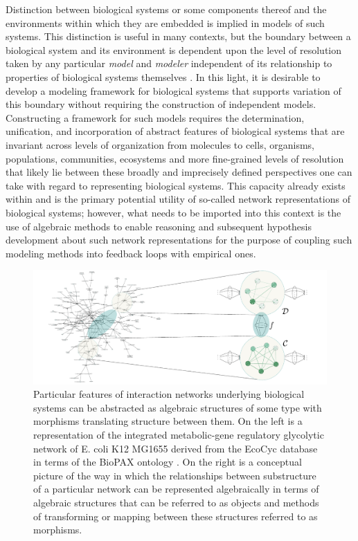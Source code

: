 \documentclass[aps,twocolumn]{revtex4-1}
\begin{document}
Distinction between biological systems or some components thereof and the environments within which they are embedded is implied in models of such systems. This distinction is useful in many contexts, but the boundary between a biological system and its environment is dependent upon the level of resolution taken by any particular \emph{model} and \emph{modeler} independent of its relationship to properties of biological systems themselves \cite{Fontana1996}. In this light, it is desirable to develop a modeling framework for biological systems that supports variation of this boundary without requiring the construction of independent models. Constructing a framework for such models requires the determination, unification, and incorporation of abstract features of biological systems that are invariant across levels of organization from molecules to cells, organisms, populations, communities, ecosystems and more fine-grained levels of resolution that likely lie between these broadly and imprecisely defined perspectives one can take with regard to representing biological systems. This capacity already exists within and is the primary potential utility of so-called network representations of biological systems; however, what needs to be imported into this context is the use of algebraic methods to enable reasoning and subsequent hypothesis development about such network representations for the purpose of coupling such modeling methods into feedback loops with empirical ones.

\begin{figure}
\noindent\includegraphics[width=1.9\columnwidth]{fig/biograph.pdf}
\caption{Particular features of interaction networks underlying biological systems can be abstracted as algebraic structures of some type with morphisms translating structure between them. On the left is a representation of the integrated metabolic-gene regulatory glycolytic network of E. coli K12 MG1655 derived from the EcoCyc database \cite{Keseler2011} in terms of the BioPAX ontology \cite{Demir2010}. On the right is a conceptual picture of the way in which the relationships between substructure of a particular network can be represented algebraically in terms of algebraic structures that can be referred to as objects and methods of transforming or mapping between these structures referred to as morphisms.}
\label{fig:biograph}
\end{figure}
\end{document}

